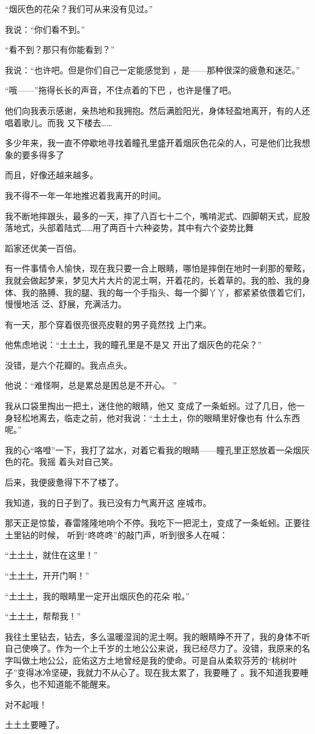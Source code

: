 \documentclass{article}
\begin{document}
“烟灰色的花朵？我们可从来没有见过。” 


我说：“你们看不到。” 


\newpage

“看不到？那只有你能看到？” 

我说：“也许吧。但是你们自己一定能感觉到
，是——那种很深的疲惫和迷茫。” 

“哦——”拖得长长的声音，不住点着的下巴
，也许是懂了吧。 

他们向我表示感谢，亲热地和我拥抱。然后满脸阳光，身体轻盈地离开，有的人还唱着歌儿。而我
又下楼去…… 

多少年来，我一直不停歇地寻找着瞳孔里盛开着烟灰色花朵的人，可是他们比我想象的要多得多了


而且，好像还越来越多。 


我不得不一年一年地推迟着我离开的时间。 

我不断地摔跟头，最多的一天，摔了八百七十二个，嘴啃泥式、四脚朝天式，屁股落地式，头部着陆式……用了两百十六种姿势，其中有六个姿势比舞
\newpage

蹈家还优美一百倍。 

有一件事情令人愉快，现在我只要一合上眼睛，哪怕是摔倒在地时一刹那的晕眩，我就会做起梦来，梦见大片大片的泥土啊，开着花的，长着草的。我的脸、我的身体、我的胳膊、我的腿、我的每一个手指头、每一个脚丫丫，都紧紧依偎着它们，慢慢地活
泛、舒展，充满活力。 

有一天，那个穿着很亮很亮皮鞋的男子竟然找
上门来。 

他焦虑地说：“土土土，我的瞳孔里是不是又
开出了烟灰色的花朵？” 


没错，是六个花瓣的。我点点头。 

他说：“难怪啊，总是累总是困总是不开心。
” 

我从口袋里掏出一把土，迷住他的眼睛，他又
\newpage
变成了一条蚯蚓。过了几日，他一身轻松地离去，临走之前，他对我说：“土土土，你的眼睛里好像也有
什么东西呢。” 

我的心“咯噔”一下，我打了盆水，对着它看我的眼睛——瞳孔里正怒放着一朵烟灰色的花。我摇
着头对自己笑。 


后来，我便疲惫得下不了楼了。 

我知道，我的日子到了。我已没有力气离开这
座城市。 

那天正是惊蛰，春雷隆隆地响个不停。我吃下一把泥土，变成了一条蚯蚓。正要往土里钻的时候，
听到“咚咚咚”的敲门声，听到很多人在喊： 


“土土土，就住在这里！” 


“土土土，开开门啊！” 

\newpage

“土土土，我的眼睛里一定开出烟灰色的花朵
啦。” 


“土土土，帮帮我！” 


我往土里钻去，钻去，多么温暖湿润的泥土啊。我的眼睛睁不开了，我的身体不听自己使唤了。作为一个上千岁的土地公公来说，我已经尽力了。没错，我原来的名字叫做土地公公，庇佑这方土地曾经是我的使命。可是自从柔软芬芳的“桃树叶子”变得冰冷坚硬，我就力不从心了。现在我太累了，我要睡了
。我不知道我要睡多久，也不知道能不能醒来。 


对不起哦！ 

土土土要睡了。
\end{document}

